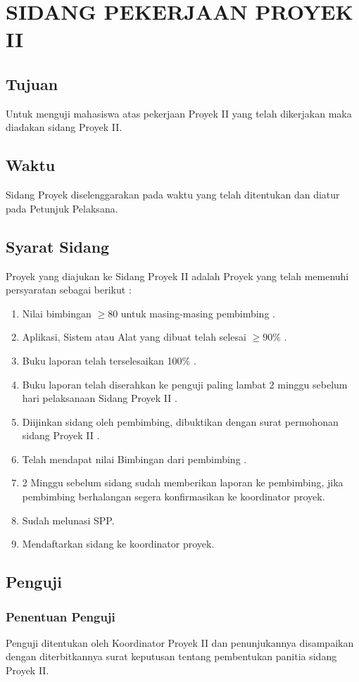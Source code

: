 \chapter{SIDANG PEKERJAAN PROYEK II}
\section{Tujuan}
Untuk	menguji	mahasiswa	atas	pekerjaan	Proyek II yang	 telah	dikerjakan	maka	diadakan	
sidang Proyek II.

\section{Waktu}
Sidang Proyek	diselenggarakan	pada	waktu	yang	telah	ditentukan	dan	diatur	pada	Petunjuk	
Pelaksana.

\section{Syarat	Sidang}
Proyek	yang	diajukan	ke	Sidang Proyek II adalah	Proyek	yang	telah	memenuhi	persyaratan	
sebagai	berikut	:

\begin{enumerate}
	\item Nilai	bimbingan	$ \geq80$ untuk	masing-masing	pembimbing .
	\item Aplikasi,	Sistem	atau	Alat	yang	dibuat	telah	selesai	$\geq90\%$ .
	\item Buku	laporan	telah	terselesaikan	100\% .
	\item Buku	 laporan	 telah	 diserahkan	 ke	 penguji	 paling	 lambat	 2	 minggu sebelum	 hari	
pelaksanaan	Sidang Proyek II .
	\item Diijinkan	sidang oleh	pembimbing,	dibuktikan	dengan	surat	permohonan	sidang Proyek
II .
	\item Telah	mendapat	nilai	Bimbingan	dari	pembimbing .
	\item 2	Minggu	sebelum	sidang	sudah	memberikan	laporan	ke	pembimbing,	jika	pembimbing	
berhalangan	segera	konfirmasikan	ke	koordinator	proyek.
	\item Sudah	melunasi	SPP.
	\item Mendaftarkan	sidang	ke	koordinator	proyek.
\end{enumerate}

\section{Penguji}
	\subsection{Penentuan Penguji}
		Penguji	ditentukan	oleh	Koordinator	Proyek	II	dan	penunjukannya	disampaikan	dengan	
diterbitkannya	surat	keputusan	tentang	pembentukan	panitia	sidang Proyek II.

